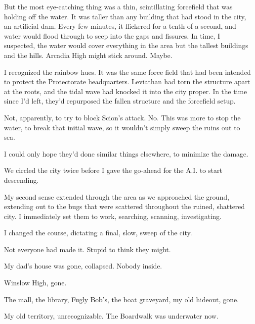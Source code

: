 But the most eye-catching thing was a thin, scintillating forcefield that was holding off the water.  It was taller than any building that had stood in the city, an artificial dam.  Every few minutes, it flickered for a tenth of a second, and water would flood through to seep into the gaps and fissures.  In time, I suspected, the water would cover everything in the area but the tallest buildings and the hills.  Arcadia High might stick around.  Maybe.



I recognized the rainbow hues.  It was the same force field that had been intended to protect the Protectorate headquarters.  Leviathan had torn the structure apart at the roots, and the tidal wave had knocked it into the city proper.  In the time since I'd left, they'd repurposed the fallen structure and the forcefield setup.



Not, apparently, to try to block Scion's attack.  No.  This was more to stop the water, to break that initial wave, so it wouldn't simply sweep the ruins out to sea.



I could only hope they'd done similar things elsewhere, to minimize the damage.



We circled the city twice before I gave the go-ahead for the A.I. to start descending.



My second sense extended through the area as we approached the ground, extending out to the bugs that were scattered throughout the ruined, shattered city.  I immediately set them to work, searching, scanning, investigating.



I changed the course, dictating a final, slow, sweep of the city.



Not everyone had made it.  Stupid to think they might.



My dad's house was gone, collapsed.  Nobody inside.



Winslow High, gone.



The mall, the library, Fugly Bob's, the boat graveyard, my old hideout, gone.



My old territory, unrecognizable.  The Boardwalk was underwater now.



